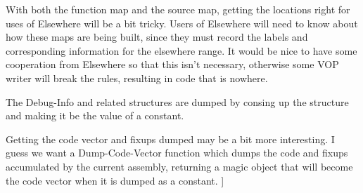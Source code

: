     With both the function map and the source map, getting the locations right
    for uses of Elsewhere will be a bit tricky.  Users of Elsewhere will need
    to know about how these maps are being built, since they must record the
    labels and corresponding information for the elsewhere range.  It would be
    nice to have some cooperation from Elsewhere so that this isn't necessary,
    otherwise some VOP writer will break the rules, resulting in code that is
    nowhere.

    The Debug-Info and related structures are dumped by consing up the
    structure and making it be the value of a constant.

    Getting the code vector and fixups dumped may be a bit more interesting.  I
    guess we want a Dump-Code-Vector function which dumps the code and fixups
    accumulated by the current assembly, returning a magic object that will
    become the code vector when it is dumped as a constant.
]
